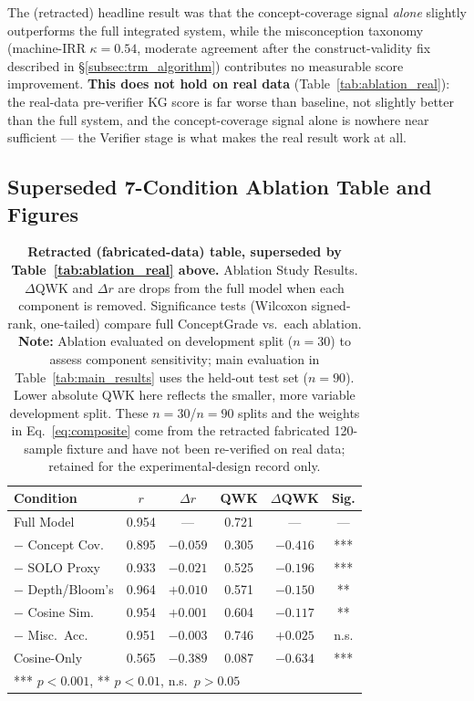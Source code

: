 \documentclass[conference]{IEEEtran}
\begin{document}
The (retracted) headline result was that the concept-coverage signal \emph{alone}
slightly outperforms the full integrated system, while the misconception
taxonomy (machine-IRR $\kappa = 0.54$, moderate agreement after the
construct-validity fix described in \S\ref{subsec:trm_algorithm})
contributes no measurable score improvement. \textbf{This does not hold on
real data} (Table~\ref{tab:ablation_real}): the real-data pre-verifier
KG score is far worse than baseline, not slightly better than the full
system, and the concept-coverage signal alone is nowhere near sufficient
--- the Verifier stage is what makes the real result work at all.


\subsection{Superseded 7-Condition Ablation Table and Figures}

\begin{table}[t]
\caption{\textbf{Retracted (fabricated-data) table, superseded by Table~\ref{tab:ablation_real} above.}
         Ablation Study Results. $\Delta$QWK and $\Delta r$ are drops from the
         full model when each component is removed. Significance tests (Wilcoxon
         signed-rank, one-tailed) compare full ConceptGrade vs.\ each ablation.
         \textbf{Note:} Ablation evaluated on development split ($n = 30$) to
         assess component sensitivity; main evaluation in Table~\ref{tab:main_results}
         uses the held-out test set ($n = 90$). Lower absolute QWK here reflects
         the smaller, more variable development split. These $n=30$/$n=90$ splits
         and the weights in Eq.~\ref{eq:composite} come from the retracted
         fabricated 120-sample fixture and have not been re-verified on real data;
         retained for the experimental-design record only.}
\label{tab:ablation}
\centering
\footnotesize
\begin{tabular}{lccccc}
\toprule
\textbf{Condition} & \textbf{$r$} & \textbf{$\Delta r$} &
\textbf{QWK} & \textbf{$\Delta$QWK} & \textbf{Sig.} \\
\midrule
Full Model           & 0.954 & —        & 0.721 & —        & — \\
$-$ Concept Cov.     & 0.895 & $-0.059$ & 0.305 & $-0.416$ & *** \\
$-$ SOLO Proxy       & 0.933 & $-0.021$ & 0.525 & $-0.196$ & *** \\
$-$ Depth/Bloom's    & 0.964 & $+0.010$ & 0.571 & $-0.150$ & ** \\
$-$ Cosine Sim.      & 0.954 & $+0.001$ & 0.604 & $-0.117$ & ** \\
$-$ Misc.\ Acc.      & 0.951 & $-0.003$ & 0.746 & $+0.025$ & n.s. \\
Cosine-Only          & 0.565 & $-0.389$ & 0.087 & $-0.634$ & *** \\
\midrule
\multicolumn{6}{l}{*** $p{<}0.001$, ** $p{<}0.01$, n.s.\ $p{>}0.05$} \\
\bottomrule
\end{tabular}
\end{table}
\end{document}
